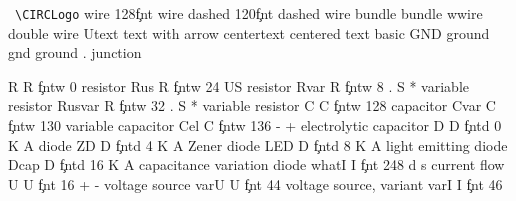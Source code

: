 
\freecirc
\hbox{ \CIRCLogo \endcircuit\hskip3cm
  \verb|\CIRCLogo|}\vskip5mm
\cwdef        wire   {128\c*fnt}
 {wire}
\cwdef        dashed {120\c*fnt}
 {dashed wire}
\cwwdef bundle {bundle}
\cwwdef wwire {double wire}
\textdef Utext {text with arrow}
\textdef centertext {centered text}
\optionline basic
\cdefo GND ground
\cdefo gnd ground
\cdefo . junction \par
\cdef         R     R     \c*fntw    0
 {resistor}
\cdef         Rus   R     \c*fntw   24
 {US resistor}
\cdefviii     Rvar  R     \c*fntw    8          . S *
 {variable resistor}
\cdefviii     Rusvar R    \c*fntw   32          . S *
 {variable resistor}
\cdef         C     C     \c*fntw  128
 {capacitor}
\cdef         Cvar  C     \c*fntw  130
 {variable capacitor}
\cdefiv       Cel   C     \c*fntw  136          - +
 {electrolytic capacitor}
\cdefiv       D     D     \c*fntd    0          K A
 {diode}
\cdefiv       ZD    D     \c*fntd    4          K A
 {Zener diode}
\cdefiviv     LED   D     \c*fntd    8          K A
 {light emitting diode}
\cdefiv       Dcap  D     \c*fntd   16          K A
 {capacitance variation diode}
\cdefiv       whatI I     \c*fnt   248          d s
 {current flow}
\cdefiv       U     U     \c*fnt    16          + -
 {voltage source}
\cdef       varU  U   \c*fnt  44
 {voltage source, variant}
\cdef       varI  I   \c*fnt 46
